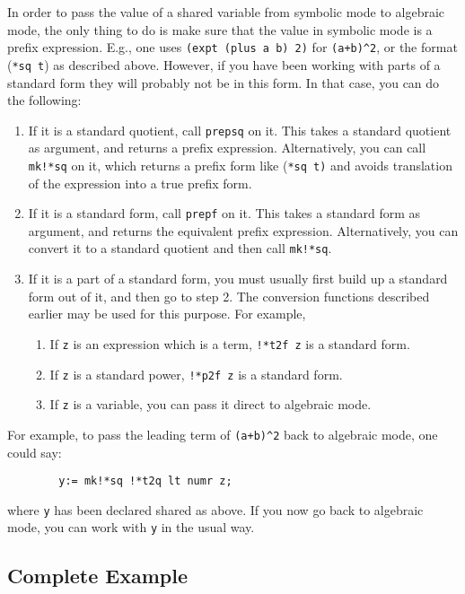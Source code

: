 In order to pass the value of a shared variable from symbolic mode to
algebraic mode, the only thing to do is make sure that the value in
symbolic mode is a prefix expression. E.g., one uses
\texttt{(expt (plus a b) 2)} for \texttt{(a+b)\textasciicircum 2}, or
the format (\texttt{*sq  t}) as described above.  However, if you have
been working with parts of a standard form they will probably not be in
this form.  In that case, you can do the following:
\begin{enumerate}
\item If it is a standard quotient, call \texttt{prepsq} on it.  This takes a
standard quotient as argument, and returns a prefix expression.
Alternatively, you can call \texttt{mk!*sq} on it, which returns a prefix
form like (\texttt{*sq  t)} and avoids translation of
the expression into a true prefix form.

\item If it is a standard form, call \texttt{prepf} on it.  This takes a
standard form as argument, and returns the equivalent prefix expression.
Alternatively, you can convert it to a standard quotient and then call
\texttt{mk!*sq}.

\item If it is a part of a standard form, you must usually first build up a
standard form out of it, and then go to step 2. The conversion functions
described earlier may be used for this purpose. For example,
\begin{enumerate}
\item If \texttt{z} is an expression which is a term, \texttt{!*t2f z} is a
standard form.
\item If \texttt{z} is a standard power, \texttt{!*p2f z} is a standard form.
\item If \texttt{z} is a variable, you can pass it direct to algebraic mode.
\end{enumerate}
\end{enumerate}
For example, to pass the leading term of \texttt{(a+b)\textasciicircum 2} back to
algebraic mode, one could say:
\begin{verbatim}
        y:= mk!*sq !*t2q lt numr z;
\end{verbatim}
where \texttt{y} has been declared shared as above.  If you now go back to
algebraic mode, you can work with \texttt{y} in the usual way.


\subsection{Complete Example}

